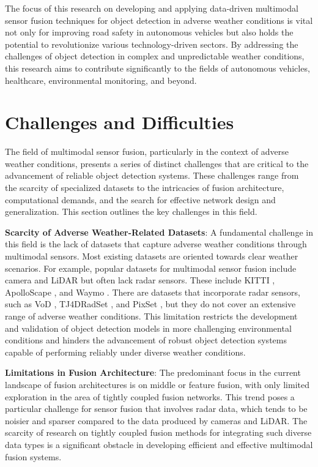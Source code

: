 \documentclass[report.tex]{subfiles}
\begin{document}
        The focus of this research on developing and applying data-driven multimodal sensor fusion techniques for object detection in adverse weather conditions is vital not only for improving road safety in autonomous vehicles but also holds the potential to revolutionize various technology-driven sectors. By addressing the challenges of object detection in complex and unpredictable weather conditions, this research aims to contribute significantly to the fields of autonomous vehicles, healthcare, environmental monitoring, and beyond.

    \section{Challenges and Difficulties}

        The field of multimodal sensor fusion, particularly in the context of adverse weather conditions, presents a series of distinct challenges that are critical to the advancement of reliable object detection systems. These challenges range from the scarcity of specialized datasets to the intricacies of fusion architecture, computational demands, and the search for effective network design and generalization. This section outlines the key challenges in this field.

        \textbf{Scarcity of Adverse Weather-Related Datasets}: A fundamental challenge in this field is the lack of datasets that capture adverse weather conditions through multimodal sensors. Most existing datasets are oriented towards clear weather scenarios. For example, popular datasets for multimodal sensor fusion include camera and LiDAR but often lack radar sensors. These include KITTI \cite{geiger2012we}, ApolloScape \cite{huang2019apolloscape}, and Waymo \cite{sun2020scalability}. There are datasets that incorporate radar sensors, such as VoD \cite{palffy2022multi}, TJ4DRadSet \cite{zheng2022tj4dradset}, and PixSet \cite{deziel2021pixset}, but they do not cover an extensive range of adverse weather conditions. This limitation restricts the development and validation of object detection models in more challenging environmental conditions and hinders the advancement of robust object detection systems capable of performing reliably under diverse weather conditions.

        \textbf{Limitations in Fusion Architecture}: The predominant focus in the current landscape of fusion architectures is on middle or feature fusion, with only limited exploration in the area of tightly coupled fusion networks. This trend poses a particular challenge for sensor fusion that involves radar data, which tends to be noisier and sparser compared to the data produced by cameras and LiDAR. The scarcity of research on tightly coupled fusion methods for integrating such diverse data types is a significant obstacle in developing efficient and effective multimodal fusion systems.
\end{document}
